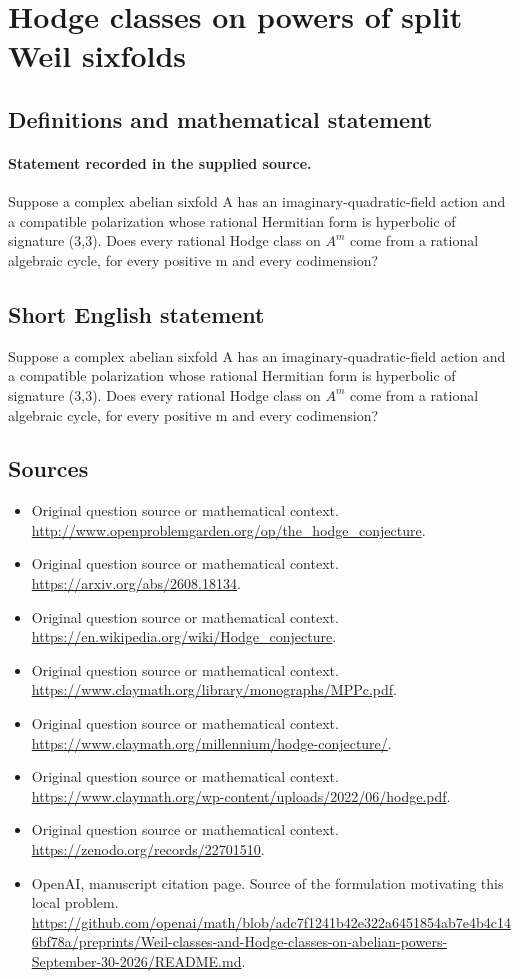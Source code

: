 \documentclass[11pt]{article}
\begin{document}
\section*{Hodge classes on powers of split Weil sixfolds}\label{statement}
\subsection{Definitions and mathematical statement}
\paragraph{Statement recorded in the supplied source.}
Suppose a complex abelian sixfold A has an imaginary-quadratic-field action and a compatible polarization whose rational Hermitian form is hyperbolic of signature (3,3). Does every rational Hodge class on $A^m$ come from a rational algebraic cycle, for every positive m and every codimension?
\subsection{Short English statement}
Suppose a complex abelian sixfold A has an imaginary-quadratic-field action and a compatible polarization whose rational Hermitian form is hyperbolic of signature (3,3). Does every rational Hodge class on $A^m$ come from a rational algebraic cycle, for every positive m and every codimension?
\subsection{Sources}
\begin{itemize}
\item[S1] Original question source or mathematical context.
\url{http://www.openproblemgarden.org/op/the_hodge_conjecture}.
\item[S2] Original question source or mathematical context.
\url{https://arxiv.org/abs/2608.18134}.
\item[S3] Original question source or mathematical context.
\url{https://en.wikipedia.org/wiki/Hodge_conjecture}.
\item[S4] Original question source or mathematical context.
\url{https://www.claymath.org/library/monographs/MPPc.pdf}.
\item[S5] Original question source or mathematical context.
\url{https://www.claymath.org/millennium/hodge-conjecture/}.
\item[S6] Original question source or mathematical context.
\url{https://www.claymath.org/wp-content/uploads/2022/06/hodge.pdf}.
\item[S7] Original question source or mathematical context.
\url{https://zenodo.org/records/22701510}.
\item[S8] OpenAI, manuscript citation page. Source of the formulation motivating this local problem.
\url{https://github.com/openai/math/blob/adc7f1241b42e322a6451854ab7e4b4c146bf78a/preprints/Weil-classes-and-Hodge-classes-on-abelian-powers-September-30-2026/README.md}.
\end{itemize}
\end{document}
